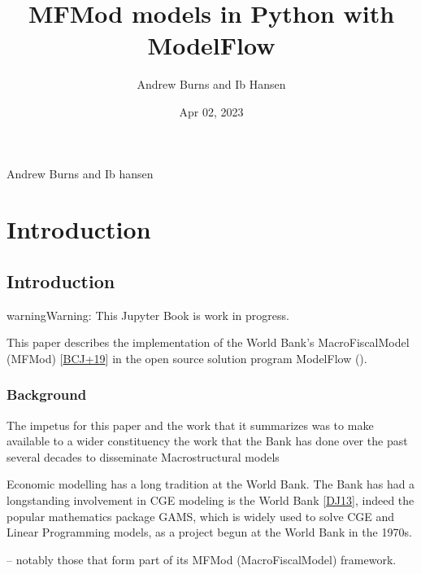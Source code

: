 \documentclass[letterpaper,10pt,english]{jupyterBook}
\title{MFMod models in Python with ModelFlow}
\date{Apr 02, 2023}
\author{Andrew Burns and Ib Hansen}
\begin{document}
\pagestyle{empty}
\sphinxmaketitle
\pagestyle{plain}
\sphinxtableofcontents
\pagestyle{normal}
\label{\detokenize{introduction::doc}}


\sphinxAtStartPar
Andrew Burns and Ib hansen

\sphinxstepscope


\part{Introduction}

\sphinxstepscope


\chapter{Introduction}
\label{\detokenize{content/01_Introduction/Introduction:introduction}}\label{\detokenize{content/01_Introduction/Introduction::doc}}
\begin{sphinxadmonition}{warning}{Warning:}
\sphinxAtStartPar
This Jupyter Book is work in progress.
\end{sphinxadmonition}

\sphinxAtStartPar
This paper describes the implementation of the World Bank’s MacroFiscalModel (MFMod) {[}\hyperlink{cite.content/litterature:id15}{BCJ+19}{]} in the open source solution program ModelFlow ().


\section{Background}
\label{\detokenize{content/01_Introduction/Introduction:background}}
\sphinxAtStartPar
The impetus for this paper and the work that it summarizes was to make available to a wider constituency the work that the Bank has done over the past several decades to disseminate Macro\sphinxhyphen{}structural models%
\begin{footnote}[1]\sphinxAtStartFootnote
Economic modelling has a long tradition at the World Bank.  The Bank has had a long\sphinxhyphen{}standing involvement in CGE modeling is the World Bank {[}\hyperlink{cite.content/litterature:id19}{DJ13}{]}, indeed the popular mathematics package GAMS, which is widely used to solve CGE and Linear Programming models,  as a project begun at the World Bank in the 1970s.
%
\end{footnote} – notably those that form part of its MFMod (MacroFiscalModel) framework.
\end{document}
